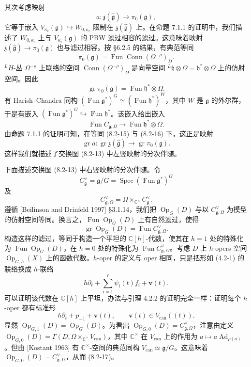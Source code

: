 其次考虑映射
\[
    a:\mathfrak z(\hat{\mathfrak g})\longrightarrow\pi_0(\mathfrak g),
\]
它等于嵌入 $V_{\kappa_c}(\mathfrak g)\hookrightarrow W_{0,\kappa_c}$ 限制在 $\mathfrak z(\hat{\mathfrak g})$ 上。在命题 7.1.1 的证明中，我们描述了 $W_{0,\kappa_c}$ 上与 $V_{\kappa_c}(\mathfrak g)$ 的 PBW 滤过相容的滤过。这意味着映射 $\mathfrak z(\hat{\mathfrak g})\to\pi_0(\mathfrak g)$ 也与滤过相容。按 §6.2.5 的结果，有典范等同
\[
    \pi_0(\mathfrak g)=\operatorname{Fun}\operatorname{Conn}(\Omega^{-\rho})_D.
\]
${}^LH$-丛 $\Omega^{-\rho}$ 上联络的空间 $\operatorname{Conn}(\Omega^{-\rho})_D$ 是向量空间 ${}^L\mathfrak h\otimes\Omega=\mathfrak h^*\otimes\Omega$ 上的仿射空间。因此
\begin{equation}
    \operatorname{gr}\pi_0(\mathfrak g)=\operatorname{Fun}\mathfrak h^*\otimes\Omega.
    \tag{8.2-16}
\end{equation}
有 Harish--Chandra 同构 $(\operatorname{Fun}\mathfrak g^*)^G\simeq(\operatorname{Fun}\mathfrak h^*)^W$，其中 $W$ 是 $\mathfrak g$ 的外尔群，于是有嵌入 $(\operatorname{Fun}\mathfrak g^*)^G\hookrightarrow\operatorname{Fun}\mathfrak h^*$。该嵌入给出嵌入
\[
    \operatorname{Fun}C_{\mathfrak g,\Omega}\longrightarrow\operatorname{Fun}\mathfrak h^*\otimes\Omega.
\]
由命题 7.1.1 的证明可知，在等同 (8.2-15) 与 (8.2-16) 下，这正是映射
\[
    \operatorname{gr}a:\operatorname{gr}\mathfrak z(\hat{\mathfrak g})\longrightarrow\operatorname{gr}\pi_0(\mathfrak g).
\]
这样我们就描述了交换图 (8.2-13) 中左竖映射的分次伴随。

下面描述交换图 (8.2-13) 中右竖映射的分次伴随。令
\[
    C^\vee_{\mathfrak g}=\mathfrak g/G=\operatorname{Spec}(\operatorname{Fun}\mathfrak g^*)^G
\]
及
\[
    C^\vee_{\mathfrak g,\Omega}=\Omega\times_{\mathbb C^\times}C^\vee_{\mathfrak g}.
\]
遵循 [Beilinson and Drinfeld 1997] §3.1.14，我们把 $\operatorname{Op}_G(D)$ 与以 $C^\vee_{\mathfrak g,\Omega}$ 为模型的仿射空间等同。换言之，$\operatorname{Fun}\operatorname{Op}_G(D)$ 上有自然滤过，使得
\begin{equation}
    \operatorname{gr}\operatorname{Op}_G(D)=\operatorname{Fun}C^\vee_{\mathfrak g,\Omega}.
    \tag{8.2-17}
\end{equation}
构造这样的滤过，等同于构造一个平坦的 $\mathbb C[h]$-代数，使其在 $h=1$ 处的特殊化为 $\operatorname{Fun}\operatorname{Op}_G(D)$，在 $h=0$ 处的特殊化为 $\operatorname{Fun}C^\vee_{\mathfrak g,\Omega}$。考虑 $D$ 上 $h$-opers 空间 $\operatorname{Op}_{G,h}(X)$ 上的函数代数。$h$-oper 的定义与 oper 相同，只是把形如 (4.2-1) 的联络换成 $h$-联络
\[
    h\partial_t+\sum_{i=1}^{\ell}\psi_i(t)f_i+\mathbf v(t).
\]
可以证明该代数在 $\mathbb C[h]$ 上平坦，办法与引理 4.2.2 的证明完全一样：证明每个 $h$-oper 都有标准形
\[
    h\partial_t+p_{-1}+\mathbf v(t),\qquad \mathbf v(t)\in V_{\mathrm{can}}((t)).
\]
显然 $\operatorname{Op}_{G,1}(D)=\operatorname{Op}_G(D)$。为看出 $\operatorname{Op}_{G,0}(D)=C^\vee_{\mathfrak g,\Omega}$，注意由定义 $\operatorname{Op}_{G,0}(D)=\Gamma(D,\Omega\times_{\mathbb C^\times}V_{\mathrm{can}})$，其中 $\mathbb C^\times$ 在 $V_{\mathrm{can}}$ 上的作用为 $a\mapsto a\operatorname{Ad}_{\rho(a)}$。但由 [Kostant 1963] 有 $\mathbb C^\times$-空间的典范同构 $V_{\mathrm{can}}\simeq\mathfrak g/G$。这意味着 $\operatorname{Op}_{G,0}(D)=C^\vee_{\mathfrak g,\Omega}$，从而 (8.2-17)。

